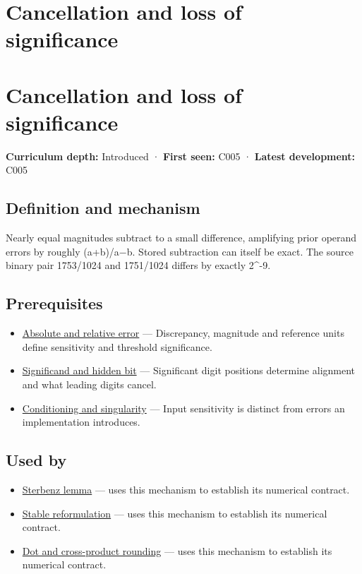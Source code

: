 \hypertarget{appendix-a2773a6a2f9d}{}
\section*{Cancellation and loss of significance}
\section{Cancellation and loss of significance}\label{cancellation-and-loss-of-significance}

\textbf{Curriculum depth:} Introduced · \textbf{First seen:} C005 · \textbf{Latest development:} C005

\subsection{Definition and mechanism}\label{definition-and-mechanism}

Nearly equal magnitudes subtract to a small difference, amplifying prior operand errors by roughly (\textbar a\textbar+\textbar b\textbar)/\textbar a−b\textbar. Stored subtraction can itself be exact. The source binary pair 1753/1024 and 1751/1024 differs by exactly 2\^{}-9.

\subsection{Prerequisites}\label{prerequisites}

\begin{itemize}
\tightlist
\item
  \hyperref[appendix-3ae74e89b4e6]{Absolute and relative error} --- Discrepancy, magnitude and reference units define sensitivity and threshold significance.
\item
  \hyperref[appendix-a24fd710cf67]{Significand and hidden bit} --- Significant digit positions determine alignment and what leading digits cancel.
\item
  \hyperref[appendix-8f6a01f284a7]{Conditioning and singularity} --- Input sensitivity is distinct from errors an implementation introduces.
\end{itemize}

\subsection{Used by}\label{used-by}

\begin{itemize}
\tightlist
\item
  \hyperref[appendix-399b7ad53f39]{Sterbenz lemma} --- uses this mechanism to establish its numerical contract.
\item
  \hyperref[appendix-d7f8ba961670]{Stable reformulation} --- uses this mechanism to establish its numerical contract.
\item
  \hyperref[appendix-5aef4f13483a]{Dot and cross-product rounding} --- uses this mechanism to establish its numerical contract.
\end{itemize}

